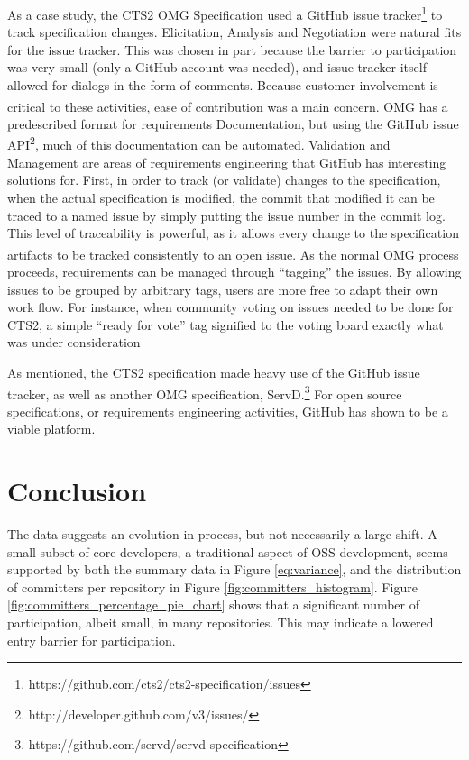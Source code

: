 \documentclass{proc}
\begin{document}
{{{{{As a case study, the CTS2 OMG\textsuperscript{\textregistered} Specification\cite{cts2} used a GitHub issue tracker\footnote{https://github.com/cts2/cts2-specification/issues} to track specification changes. Elicitation, Analysis and Negotiation were natural fits for the issue tracker. This was chosen in part because the barrier to participation was very small (only a GitHub account was needed), and issue tracker itself allowed for dialogs in the form of comments. Because customer involvement is critical to these activities\cite{paetsch2003requirements}, ease of contribution was a main concern. OMG\textsuperscript{\textregistered} has a predescribed format for requirements Documentation, but using the GitHub issue API\footnote{http://developer.github.com/v3/issues/}, much of this documentation can be automated.
Validation and Management are areas of requirements engineering that GitHub has interesting solutions for. First, in order to track (or validate) changes to the specification, when the actual specification is modified, the commit that modified it can be traced to a named issue by simply putting the issue number in the commit log. This level of traceability is powerful, as it allows every change to the specification artifacts to be tracked consistently to an open issue. As the normal OMG\textsuperscript{\textregistered} process proceeds, requirements can be managed through ``tagging'' the issues. By allowing issues to be grouped by arbitrary tags, users are more free to adapt their own work flow. For instance, when community voting on issues needed to be done for CTS2, a simple ``ready for vote'' tag signified to the voting board exactly what was under consideration

As mentioned, the CTS2 specification made heavy use of the GitHub issue tracker, as well as another OMG\textsuperscript{\textregistered} specification, ServD.\footnote{https://github.com/servd/servd-specification} For open source specifications, or requirements engineering activities, GitHub has shown to be a viable platform. 

\section{Conclusion}
The data suggests an evolution in process, but not necessarily a large shift. A small subset of core developers, a traditional aspect of OSS development\cite{mockus2000case,mockus2002two,krishnamurthy2002cave}, seems supported by both the summary data in Figure \ref{eq:variance}, and the distribution of committers per repository in Figure \ref{fig:committers_histogram}. Figure \ref{fig:committers_percentage_pie_chart} shows that a significant number of participation, albeit small, in many repositories. This may indicate a lowered entry barrier for participation.

}}}}}
\end{document}
